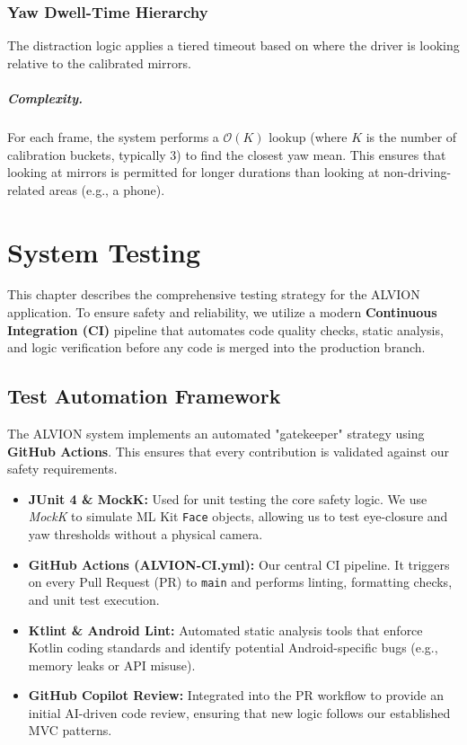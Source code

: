 \documentclass[11pt]{report}
\begin{document}
\subsection{Yaw Dwell-Time Hierarchy}\label{subsec:yaw-algo}
The distraction logic applies a tiered timeout based on where the driver is looking relative to the calibrated mirrors.

\paragraph{Complexity.}
For each frame, the system performs a $\mathcal{O}(K)$ lookup (where $K$ is the number of calibration buckets, typically 3) to find the closest yaw mean. This ensures that looking at mirrors is permitted for longer durations than looking at non-driving-related areas (e.g., a phone).

\clearpage

\chapter{System Testing}
This chapter describes the comprehensive testing strategy for the ALVION application. To ensure safety and reliability, we utilize a modern \textbf{Continuous Integration (CI)} pipeline that automates code quality checks, static analysis, and logic verification before any code is merged into the production branch.

\section{Test Automation Framework}  %

The ALVION system implements an automated "gatekeeper" strategy using \textbf{GitHub Actions}. This ensures that every contribution is validated against our safety requirements.

\begin{itemize}
    \item \textbf{JUnit 4 \& MockK:} Used for unit testing the core safety logic. We use \textit{MockK} to simulate ML Kit \texttt{Face} objects, allowing us to test eye-closure and yaw thresholds without a physical camera.
    \item \textbf{GitHub Actions (ALVION-CI.yml):} Our central CI pipeline. It triggers on every Pull Request (PR) to \texttt{main} and performs linting, formatting checks, and unit test execution.
    \item \textbf{Ktlint \& Android Lint:} Automated static analysis tools that enforce Kotlin coding standards and identify potential Android-specific bugs (e.g., memory leaks or API misuse).
    \item \textbf{GitHub Copilot Review:} Integrated into the PR workflow to provide an initial AI-driven code review, ensuring that new logic follows our established MVC patterns.
\end{itemize}
\end{document}
